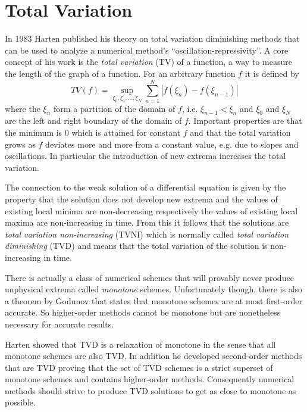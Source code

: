 \section{Total Variation}
\label{sec:total-variation}

In 1983 Harten published his theory on total variation diminishing methods \cite{Harten1983} that can be used to analyze a numerical method's ``oscillation-repressivity''.
A core concept of his work is the \emph{total variation} (TV) of a function, a way to measure the length of the graph of a function.
For an arbitrary function $f$ it is defined\cite[Sec. 6.7]{LeVequeFVMforHP} by
\begin{equation*}
  TV(f) = \sup_{\xi_{0}, \xi_{1}, \dots, \xi_{N}} \sum_{n = 1}^{N} |f(\xi_{n}) - f(\xi_{n - 1})|
\end{equation*}
where the $\xi_{n}$ form a partition of the domain of $f$, i.e. $\xi_{n - 1} < \xi_{n}$ and $\xi_{0}$ and $\xi_{N}$ are the left and right boundary of the domain of $f$.
Important properties are that the minimum is $0$ which is attained for constant $f$ and that the total variation grows as $f$ deviates more and more from a constant value, e.g. due to slopes and oscillations.
In particular the introduction of new extrema increases the total variation.

The connection to the weak solution of a differential equation is given by the property that the solution does not develop new extrema and the values of existing local minima are non-decreasing respectively the values of existing local maxima are non-increasing in time.
From this it follows that the solutions are \emph{total variation non-increasing} (TVNI) which is normally called \emph{total variation diminishing} (TVD) and means that the total variation of the solution is non-increasing in time.

There is actually a class of numerical schemes that will provably never produce unphysical extrema called \emph{monotone} schemes.
Unfortunately though, there is also a theorem by Godunov\cite{Godunov1959} that states that monotone schemes are at most first-order accurate.
So higher-order methods cannot be monotone but are nonetheless necessary for accurate results.

Harten showed that TVD is a relaxation of monotone in the sense that all monotone schemes are also TVD.
In addition he developed second-order methods that are TVD proving that the set of TVD schemes is a strict superset of monotone schemes and contains higher-order methods.
Consequently numerical methods should strive to produce TVD solutions to get as close to monotone as possible.

